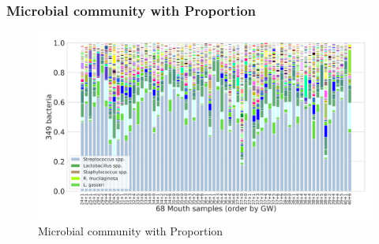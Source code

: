 \documentclass{beamer}
\begin{document}
    \begin{frame}
        \frametitle{Microbial community with Proportion}

        \begin{figure}
            \includegraphics[width=0.8 \linewidth]{figures/Step60_Proportion/everything.DADA2.homd.uncorrected/Mouth.pdf}
            \caption{Microbial community with Proportion}
        \end{figure}
    \end{frame}
\end{document}
